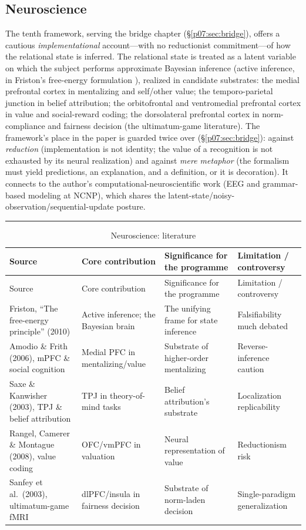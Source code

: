 \documentclass[11pt,a4paper]{article}
\newcommand{\goldrule}{\noindent\textcolor{gold}{\rule{\linewidth}{0.6pt}}\par\vspace{0.4em}}
\newcommand{\xref}[1]{\textcolor{rose}{\S\ref{#1}}}
\begin{document}
\subsection{Neuroscience}
The tenth framework, serving the bridge chapter (\xref{p07:sec:bridge}), offers a cautious \emph{implementational} account---with no reductionist commitment---of how the relational state is inferred. The relational state is treated as a latent variable on which the subject performs approximate Bayesian inference (active inference, in Friston's free-energy formulation \parencite{friston2010fep,friston2017process,parr2022active}), realized in candidate substrates: the medial prefrontal cortex in mentalizing and self/other value; the temporo-parietal junction in belief attribution; the orbitofrontal and ventromedial prefrontal cortex in value and social-reward coding; the dorsolateral prefrontal cortex in norm-compliance and fairness decision (the ultimatum-game literature). The framework's place in the paper is guarded twice over (\xref{p07:sec:bridge}): against \emph{reduction} (implementation is not identity; the value of a recognition is not exhausted by its neural realization) and against \emph{mere metaphor} (the formalism must yield predictions, an explanation, and a definition, or it is decoration). It connects to the author's computational-neuroscientific work (EEG and grammar-based modeling at NCNP), which shares the latent-state/noisy-observation/sequential-update posture.

\goldrule
\footnotesize
\begin{longtable}{Y Y Y Y}
\caption{Neuroscience: literature}\label{p07:tab:lit-neuro}\\
\toprule
{}
Source & Core contribution & Significance for the programme & Limitation / controversy \\
\midrule
\endfirsthead
{}
Source & Core contribution & Significance for the programme & Limitation / controversy \\
\midrule
\endhead
Friston, ``The free-energy principle'' (2010) & Active inference; the Bayesian brain & The unifying frame for state inference & Falsifiability much debated \\
Amodio \& Frith (2006), mPFC \& social cognition & Medial PFC in mentalizing/value & Substrate of higher-order mentalizing & Reverse-inference caution \\
Saxe \& Kanwisher (2003), TPJ \& belief attribution & TPJ in theory-of-mind tasks & Belief attribution's substrate & Localization replicability \\
Rangel, Camerer \& Montague (2008), value coding & OFC/vmPFC in valuation & Neural representation of value & Reductionism risk \\
Sanfey et al.\ (2003), ultimatum-game fMRI & dlPFC/insula in fairness decision & Substrate of norm-laden decision & Single-paradigm generalization \\
\bottomrule
\end{longtable}
\end{document}
